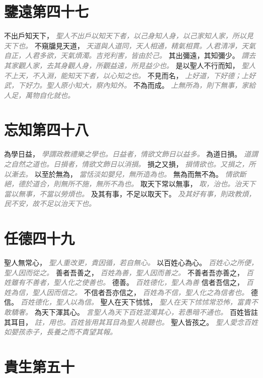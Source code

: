 \documentclass[a4paper,zihao=-4,oneside,landscape,UTF8]{ctexart}
\newcommand{\zhushi}[1]{\scriptsize{\textit{\textcolor{gray}{#1}}}\normalsize}
\begin{document}
\section{鑒遠第四十七}

不出戶知天下，
\zhushi{聖人不出戶以知天下者，以己身知人身，以己家知人家，所以見天下也。}
不窺牖見天道，
\zhushi{天道與人道同，天人相通，精氣相貫。人君清凈，天氣自正，人君多欲，天氣煩濁。吉兇利害，皆由於己。}
其出彌遠，其知彌少。
\zhushi{謂去其家觀人家，去其身觀人身，所觀益遠，所見益少也。}
是以聖人不行而知，
\zhushi{聖人不上天，不入淵，能知天下者，以心知之也。}
不見而名，
\zhushi{上好道，下好德；上好武，下好力。聖人原小知大，察內知外。}
不為而成。
\zhushi{上無所為，則下無事，家給人足，萬物自化就也。}


\section{忘知第四十八}

為學日益，
\zhushi{學謂政教禮樂之學也。日益者，情欲文飾日以益多。}
為道日損。
\zhushi{道謂之自然之道也。日損者，情欲文飾日以消損。}
損之又損，
\zhushi{損情欲也。又損之，所以漸去。}
以至於無為，
\zhushi{當恬淡如嬰兒，無所造為也。}
無為而無不為。
\zhushi{情欲斷絕，德於道合，則無所不施，無所不為也。}
取天下常以無事，
\zhushi{取，治也。治天下當以無事，不當以勞煩也。}
及其有事，不足以取天下。
\zhushi{及其好有事，則政教煩，民不安，故不足以治天下也。}


\section{任德四十九}

聖人無常心，
\zhushi{聖人重改更，貴因循，若自無心。}
以百姓心為心。
\zhushi{百姓心之所便，聖人因而從之。}
善者吾善之，
\zhushi{百姓為善，聖人因而善之。}
不善者吾亦善之，
\zhushi{百姓雖有不善者，聖人化之使善也。}
德善。
\zhushi{百姓德化，聖人為善}
信者吾信之，
\zhushi{百姓為信，聖人因而信之。}
不信者吾亦信之，
\zhushi{百姓為不信，聖人化之為信者也。}
德信。
\zhushi{百姓德化，聖人以為信。}
聖人在天下怵怵，
\zhushi{聖人在天下怵怵常恐怖，富貴不敢驕奢。}
為天下渾其心。
\zhushi{言聖人為天下百姓混濁其心，若愚暗不通也。}
百姓皆註其耳目，
\zhushi{註，用也。百姓皆用其耳目為聖人視聽也。}
聖人皆孩之。
\zhushi{聖人愛念百姓如嬰孩赤子，長養之而不責望其報。}


\section{貴生第五十}
\end{document}
